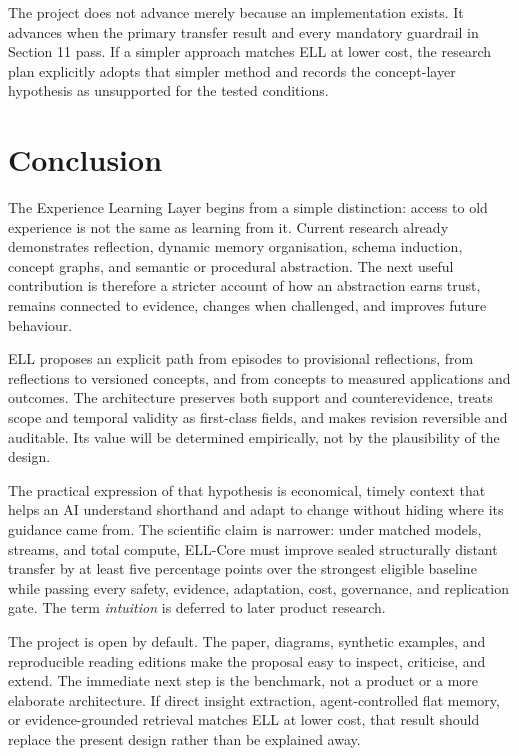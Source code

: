 \documentclass[
  english,
  a4paper,
  DIV=11,
  numbers=noendperiod]{scrreprt}
\begin{document}
The project does not advance merely because an implementation exists. It
advances when the primary transfer result and every mandatory guardrail
in Section 11 pass. If a simpler approach matches ELL at lower cost, the
research plan explicitly adopts that simpler method and records the
concept-layer hypothesis as unsupported for the tested conditions.


\chapter{Conclusion}\label{conclusion}

The Experience Learning Layer begins from a simple distinction: access
to old experience is not the same as learning from it. Current research
already demonstrates reflection, dynamic memory organisation, schema
induction, concept graphs, and semantic or procedural abstraction. The
next useful contribution is therefore a stricter account of how an
abstraction earns trust, remains connected to evidence, changes when
challenged, and improves future behaviour.

ELL proposes an explicit path from episodes to provisional reflections,
from reflections to versioned concepts, and from concepts to measured
applications and outcomes. The architecture preserves both support and
counterevidence, treats scope and temporal validity as first-class
fields, and makes revision reversible and auditable. Its value will be
determined empirically, not by the plausibility of the design.

The practical expression of that hypothesis is economical, timely
context that helps an AI understand shorthand and adapt to change
without hiding where its guidance came from. The scientific claim is
narrower: under matched models, streams, and total compute, ELL-Core
must improve sealed structurally distant transfer by at least five
percentage points over the strongest eligible baseline while passing
every safety, evidence, adaptation, cost, governance, and replication
gate. The term \emph{intuition} is deferred to later product research.

The project is open by default. The paper, diagrams, synthetic examples,
and reproducible reading editions make the proposal easy to inspect,
criticise, and extend. The immediate next step is the benchmark, not a
product or a more elaborate architecture. If direct insight extraction,
agent-controlled flat memory, or evidence-grounded retrieval matches ELL
at lower cost, that result should replace the present design rather than
be explained away.
\end{document}
